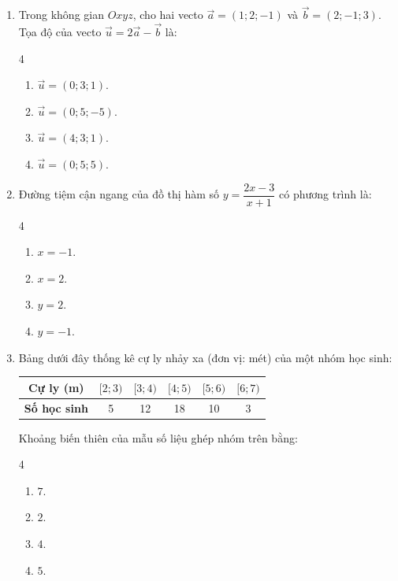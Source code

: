\documentclass[12pt]{article}
\begin{document}
	\begin{enumerate}[label=\textbf{Câu \arabic*.}, leftmargin=*]
		
		\item Trong không gian $Oxyz$, cho hai vecto $\vec{a} = (1; 2; -1)$ và $\vec{b} = (2; -1; 3)$. Tọa độ của vecto $\vec{u} = 2\vec{a} - \vec{b}$ là:
		\begin{multicols}{4}
			\begin{enumerate}[label=\Alph*.]
				\item $\vec{u} = (0; 3; 1)$.
				\item $\vec{u} = (0; 5; -5)$.
				\item $\vec{u} = (4; 3; 1)$.
				\item $\vec{u} = (0; 5; 5)$.
			\end{enumerate}
		\end{multicols}
		
		\item Đường tiệm cận ngang của đồ thị hàm số $y = \dfrac{2x - 3}{x + 1}$ có phương trình là:
		\begin{multicols}{4}
			\begin{enumerate}[label=\Alph*.]
				\item $x = -1$.
				\item $x = 2$.
				\item $y = 2$.
				\item $y = -1$.
			\end{enumerate}
		\end{multicols}
		
		\item Bảng dưới đây thống kê cự ly nhảy xa (đơn vị: mét) của một nhóm học sinh:
		\begin{center}
			\renewcommand{\arraystretch}{1.2}
			\begin{tabular}{|c|c|c|c|c|c|}
				\hline
				\textbf{Cự ly (m)} & $[2; 3)$ & $[3; 4)$ & $[4; 5)$ & $[5; 6)$ & $[6; 7)$ \\
				\hline
				\textbf{Số học sinh} & 5 & 12 & 18 & 10 & 3 \\
				\hline
			\end{tabular}
		\end{center}
		Khoảng biến thiên của mẫu số liệu ghép nhóm trên bằng:
		\begin{multicols}{4}
			\begin{enumerate}[label=\Alph*.]
				\item $7$.
				\item $2$.
				\item $4$.
				\item $5$.
			\end{enumerate}
		\end{multicols}
		

\end{enumerate}
\end{document}
